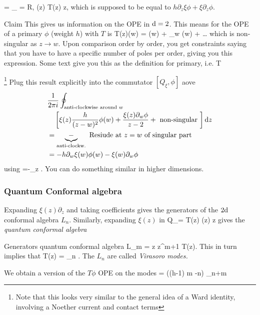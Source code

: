 \be 
[Q_\xi, \phi(w)] =  \oint_{ = R,} \xi(z) T(z) \md z,
\ee 
which is supposed to be equal to $h \partial_z \xi \phi + \xi \partial_z \phi$.
\begin{mybox}{Claim}
	This gives us information on the OPE in $\mathrm{d}=2$. This means for the OPE of a primary $\phi$ (weight $h$) with $T$ is 
	\be 
	\label{eq:cftOPE2d}
	T(z)\phi(w) =  \phi(w) +  \partial_w \phi(w) + \dots 
	\ee 
	which is non-singular as $z\rightarrow w$. Upon comparison order by order, you get constraints saying that you have to have a specific number of poles per order, giving you this expression. Some text give you this as the definition for primary, i.e. 
	\bse 
	 \leftrightarrow {}T
	\ese 
\end{mybox}\footnote{Note that this looks very similar to the general idea of a Ward identity, involving a Noether current and contact terms}
Plug this result explicitly into the commutator $[Q_\xi,\phi]$ aove
\begin{align*}
	&\frac{1}{2 \pi i}  \oint_{\text{anti-clockwise around }w} \\
	& \quad \left[\xi(z) \frac{h}{(z-w)^2} \phi(w) + \frac{\xi(z) \partial_w \phi}{z-2} + \text{ non-singular }\right] \mathrm{d} z \\
	&= \underbrace{-}_{\text{anti-clockw.}} \text{ Resiude at $z=w$ of singular part} \\
	&= - h \partial_w \xi(w) \phi(w) - \xi(w) \partial_w \phi 
\end{align*}
using 
\bse 
{} =-\partial_z .
\ese 
You can do something similar in higher dimensions.
\subsubsection{Quantum Conformal algebra}
Expanding $\xi(z)\partial_z$ and taking coefficients gives the generators of the $2\mathrm{d}$ conformal algebra $L_n$. Similarly, expanding $\xi(z)$ in 
\bse 
Q_\xi = \oint {} T(z) \xi(z) \md z 
\ese 
gives the \emph{quantum conformal algebra}
\begin{mybox}{Generators quantum conformal algebra}
	\be 
	L_m =  \oint \md z z^{m+1} T(z).
	\ee 
	This in turn implies that
	\be 
	T(z) = \sum_n . 
	\ee 
	The $L_n$ are called \emph{Virasoro modes.}
\end{mybox}
We obtain a version of the $T\phi$ OPE on the modes
\be 
[L_m,\phi_n] = \left((h-1) m -n\right) \phi_{n+m}
\ee 



